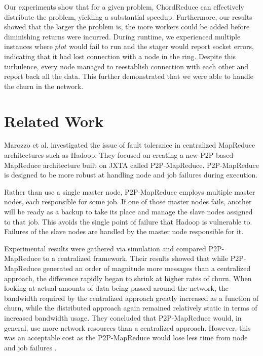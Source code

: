 Our experiments show that for a given problem, ChordReduce can effectively distribute the problem, yielding a substantial speedup.  Furthermore, our results showed that the larger the problem is, the more workers could be added before diminishing returns were incurred.  During runtime, we experienced multiple instances where $plot$ would fail to run and the stager would report socket errors, indicating that it had lost connection with a node in the ring.  Despite this turbulence, every node managed to reestablish connection with each other and report back all the data.  This further demonstrated that we were able to handle the churn in the network.



\section{Related Work}



Marozzo et al. \cite{marozzo2012p2p} investigated the issue of fault tolerance in centralized MapReduce architectures such as Hadoop.  They focused on creating a new P2P based MapReduce architecture built on JXTA \cite{935182} called P2P-MapReduce.  P2P-MapReduce is designed to be more robust at handling node and job failures during execution.

Rather than use a single master node, P2P-MapReduce employs multiple master nodes, each responsible for some job.  If one of those master nodes fails, another will be ready as a backup to take its place and manage the slave nodes assigned to that job.  This avoids the single point of failure that Hadoop is vulnerable to. Failures of the slave nodes are handled by the master node responsible for it.

Experimental results were gathered via simulation and compared P2P-MapReduce to a centralized framework. Their results showed that while P2P-MapReduce generated an order of magnitude more messages than a centralized approach, the difference rapidly began to shrink at higher rates of churn.  When looking at actual amounts of data being passed around the network, the bandwidth required by the centralized approach greatly increased as a function of churn, while the distributed approach again remained relatively static in terms of increased bandwidth usage.  They concluded that P2P-MapReduce would, in general, use more network resources than a centralized approach. However, this was an acceptable cost as the P2P-MapReduce would lose less time from node and job failures \cite{marozzo2012p2p}.


